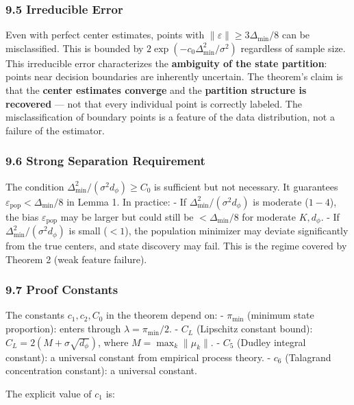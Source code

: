 \documentclass[
  12pt,
]{article}
\begin{document}
\subsubsection{9.5 Irreducible Error}\label{irreducible-error}

Even with perfect center estimates, points with
\(\|\varepsilon\| \geq 3\Delta_{\min}/8\) can be misclassified. This is
bounded by \(2\exp(-c_0 \Delta_{\min}^2 / \sigma^2)\) regardless of
sample size. This irreducible error characterizes the \textbf{ambiguity
of the state partition}: points near decision boundaries are inherently
uncertain. The theorem's claim is that the \textbf{center estimates
converge} and the \textbf{partition structure is recovered} --- not that
every individual point is correctly labeled. The misclassification of
boundary points is a feature of the data distribution, not a failure of
the estimator.

\subsubsection{9.6 Strong Separation
Requirement}\label{strong-separation-requirement}

The condition \(\Delta_{\min}^2 / (\sigma^2 d_\phi) \geq C_0\) is
sufficient but not necessary. It guarantees
\(\varepsilon_{\text{pop}} < \Delta_{\min}/8\) in Lemma 1. In practice:
- If \(\Delta_{\min}^2 / (\sigma^2 d_\phi)\) is moderate (\(1-4\)), the
bias \(\varepsilon_{\text{pop}}\) may be larger but could still be
\(< \Delta_{\min}/8\) for moderate \(K,d_\phi\). - If
\(\Delta_{\min}^2 / (\sigma^2 d_\phi)\) is small (\(< 1\)), the
population minimizer may deviate significantly from the true centers,
and state discovery may fail. This is the regime covered by Theorem 2
(weak feature failure).

\subsubsection{9.7 Proof Constants}\label{proof-constants}

The constants \(c_1, c_2, C_0\) in the theorem depend on: -
\(\pi_{\min}\) (minimum state proportion): enters through
\(\lambda = \pi_{\min}/2\). - \(C_L\) (Lipschitz constant bound):
\(C_L = 2(M + \sigma\sqrt{d_\phi})\), where \(M = \max_k \|\mu_k\|\). -
\(C_5\) (Dudley integral constant): a universal constant from empirical
process theory. - \(c_6\) (Talagrand concentration constant): a
universal constant.

The explicit value of \(c_1\) is:
\end{document}
